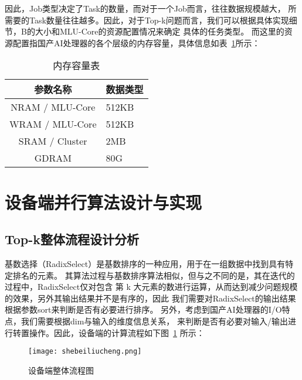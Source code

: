         因此，Job类型决定了Task的数量，而对于一个Job而言，往往数据规模越大，
        所需要的Task数量往往越多。因此，对于Top-k问题而言，我们可以根据具体实现细节，B的大小和MLU-Core的资源配置情况来确定
        具体的任务类型。
        而这里的资源配置指国产AI处理器的各个层级的内存容量，具体信息如表~\ref{tab:duiqi}所示：


\begin{table}
    \centering
    \caption{内存容量表}
    \label{tab:duiqi}
    \begin{tabular}{cl} %
      \toprule
      参数名称   & 数据类型        \\
      \midrule
      NRAM / MLU-Core & 512KB     \\
      WRAM / MLU-Core   & 512KB   \\
      SRAM / Cluster& 2MB         \\
      GDRAM       &  80G \\
      \bottomrule
    \end{tabular}
\end{table}
   



\section{设备端并行算法设计与实现}

\subsection{Top-k整体流程设计分析}





基数选择（RadixSelect）是基数排序的一种应用，用于在一组数据中找到具有特定排名的元素。
其算法过程与基数排序算法相似，但与之不同的是，其在迭代的过程中，RadixSelect仅对包含
第 k 大元素的数进行运算，从而达到减少问题规模的效果，另外其输出结果并不是有序的，因此
我们需要对RadixSelect的输出结果根据参数sort来判断是否有必要进行排序。
另外，考虑到国产AI处理器的I/O特点，我们需要根据dim与输入的维度信息关系，
来判断是否有必要对输入/输出进行转置操作。因此，设备端的计算流程如下图~\ref{fig:shebeiliucheng}
所示：

\begin{figure}[ht]
    \centering
    \texttt{[image: shebeiliucheng.png]}
    \caption{设备端整体流程图}
    \label{fig:shebeiliucheng}
\end{figure}


